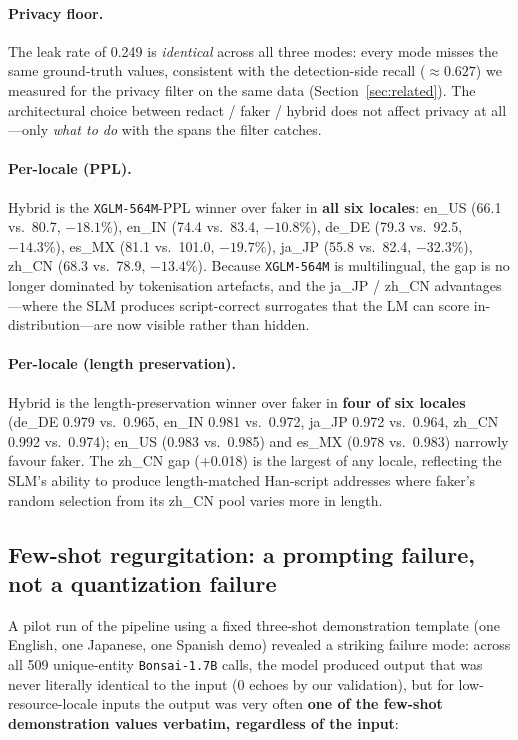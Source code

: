 \documentclass[11pt]{article}
\newcommand{\code}[1]{\texttt{#1}}
\newcommand{\bonsai}{\code{Bonsai-1.7B}}
\newcommand{\xglm}{\code{XGLM-564M}}
\begin{document}
\paragraph{Privacy floor.}
The leak rate of 0.249 is \emph{identical} across all three modes:
every mode misses the same ground-truth values, consistent with the
detection-side recall ($\approx 0.627$) we measured for the privacy
filter on the same data (Section~\ref{sec:related}). The
architectural choice between redact / faker / hybrid does not affect
privacy at all---only \emph{what to do} with the spans the filter
catches.

\paragraph{Per-locale (PPL).}
Hybrid is the \xglm{}-PPL winner over faker in \textbf{all six locales}:
en\_US (66.1 vs.\ 80.7, $-18.1\%$), en\_IN (74.4 vs.\ 83.4, $-10.8\%$),
de\_DE (79.3 vs.\ 92.5, $-14.3\%$),
es\_MX (81.1 vs.\ 101.0, $-19.7\%$),
ja\_JP (55.8 vs.\ 82.4, $-32.3\%$),
zh\_CN (68.3 vs.\ 78.9, $-13.4\%$). Because \xglm{} is multilingual,
the gap is no longer dominated by tokenisation artefacts, and the
ja\_JP / zh\_CN advantages---where the SLM produces script-correct
surrogates that the LM can score in-distribution---are now visible
rather than hidden.

\paragraph{Per-locale (length preservation).}
Hybrid is the length-preservation winner over faker in \textbf{four of
six locales} (de\_DE 0.979 vs.\ 0.965, en\_IN 0.981 vs.\ 0.972,
ja\_JP 0.972 vs.\ 0.964, zh\_CN 0.992 vs.\ 0.974); en\_US (0.983 vs.\
0.985) and es\_MX (0.978 vs.\ 0.983) narrowly favour faker. The
zh\_CN gap (+0.018) is the largest of any locale, reflecting the SLM's
ability to produce length-matched Han-script addresses where faker's
random selection from its zh\_CN pool varies more in length.

\subsection{Few-shot regurgitation: a prompting failure, not a quantization failure}
\label{sec:regurgitation}

A pilot run of the pipeline using a fixed three-shot demonstration
template (one English, one Japanese, one Spanish demo) revealed a
striking failure mode: across all 509 unique-entity \bonsai{} calls,
the model produced output that was never literally identical to the
input (0 echoes by our validation), but for low-resource-locale inputs
the output was very often \textbf{one of the few-shot demonstration
values verbatim, regardless of the input}:
\end{document}
